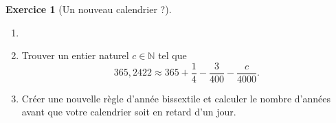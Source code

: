 \documentclass[a4paper, 14pt]{extarticle}
\theoremstyle{plain}
\theoremstyle{definition}
\newtheorem{ex}{Exercice}
\newcommand{\N}{\mathbb{N}}
\begin{document}
\begin{ex}[Un nouveau calendrier ?]

	\begin{enumerate}
		\item[]
		\item
		Trouver un entier naturel $c \in \N$ tel que
			\[ 365{,}2422 \approx 365 + \dfrac14 - \dfrac{3}{400} - \dfrac{c}{4000}.\]

		\item  Créer une nouvelle règle d'année bissextile et calculer le nombre d'années avant que votre calendrier soit en retard d'un jour.
	\end{enumerate}

\end{ex}

\vfill
\nocite{*}
\printbibliography[title={Référence}]
\end{document}
